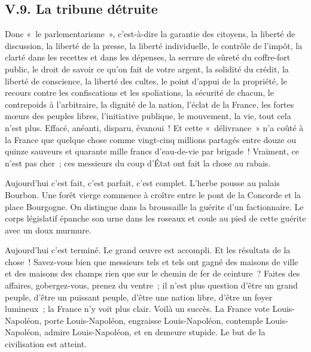 \documentclass[french,twoside]{book} %
\begin{document}
\subsection[{V.9. La tribune détruite}]{V.9. La tribune détruite}
\noindent Donc « le parlementarisme », c’est-à-dire la garantie des citoyens, la liberté de discussion, la liberté de la presse, la liberté individuelle, le contrôle de l’impôt, la clarté dans les recettes et dans les dépenses, la serrure de sûreté du coffre-fort public, le droit de savoir ce qu’on fait de votre argent, la solidité du crédit, la liberté de conscience, la liberté des cultes, le point d’appui de la propriété, le recours contre les confiscations et les spoliations, la sécurité de chacun, le contrepoids à l’arbitraire, la dignité de la nation, l’éclat de la France, les fortes mœurs des peuples libres, l’initiative publique, le mouvement, la vie, tout cela n’est plus. Effacé, anéanti, disparu, évanoui ! Et cette « délivrance » n’a coûté à la France que quelque chose comme vingt-cinq millions partagés entre douze ou quinze sauveurs et quarante mille francs d’eau-de-vie par brigade ! Vraiment, ce n’est pas cher ; ces messieurs du coup d’État ont fait la chose au rabais.\par
Aujourd’hui c’est fait, c’est parfait, c’est complet. L’herbe pousse au palais Bourbon. Une forêt vierge commence à croître entre le pont de la Concorde et la place Bourgogne. On distingue dans la broussaille la guérite d’un factionnaire. Le corps législatif épanche son urne dans les roseaux et coule au pied de cette guérite avec un doux murmure.\par
Aujourd’hui c’est terminé. Le grand œuvre est accompli. Et les résultats de la chose ! Savez-vous bien que messieurs tels et tels ont gagné des maisons de ville et des maisons des champs rien que sur le chemin de fer de ceinture ? Faites des affaires, gobergez-vous, prenez du ventre ; il n’est plus question d’être un grand peuple, d’être un puissant peuple, d’être une nation libre, d’être un foyer lumineux ; la France n’y voit plus clair. Voilà un succès. La France vote Louis-Napoléon, porte Louis-Napoléon, engraisse Louis-Napoléon, contemple Louis-Napoléon, admire Louis-Napoléon, et en demeure stupide. Le but de la civilisation est atteint.\par
\end{document}
